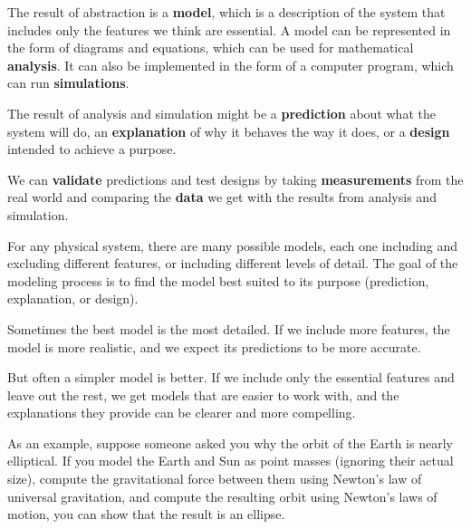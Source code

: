 \documentclass[
]{book}
\numberwithin{Answer}{chapter}
\numberwithin{Exercise}{chapter}
\begin{document}

The result of abstraction is a {\bf model}, which is a description of the system that includes only the features we think are essential.  A model can be represented in the form of diagrams and equations, which can be used for mathematical {\bf analysis}.  It can also be implemented in the form of a computer program, which can run {\bf simulations}.


The result of analysis and simulation might be a {\bf prediction} about what the system will do, an {\bf explanation} of why it behaves the way it does, or a {\bf design} intended to achieve a purpose.


We can {\bf validate} predictions and test designs by taking {\bf measurements} from the real world and comparing the {\bf data} we get with the results from analysis and simulation. 


For any physical system, there are many possible models, each one including and excluding different features, or including different levels of detail.  The goal of the modeling process is to find the model best suited to its purpose (prediction, explanation, or design).


Sometimes the best model is the most detailed.  If we include more features, the model is more realistic, and we expect its predictions to be more accurate.


But often a simpler model is better.  If we include only the essential features and leave out the rest, we get models that are easier to work with, and the explanations they provide can be clearer and more compelling.


As an example, suppose someone asked you why the orbit of the Earth is nearly elliptical.  If you model the Earth and Sun as point masses (ignoring their actual size), compute the gravitational force between them using Newton's law of universal gravitation, and compute the resulting orbit using Newton's laws of motion, you can show that the result is an ellipse.

\end{document}
